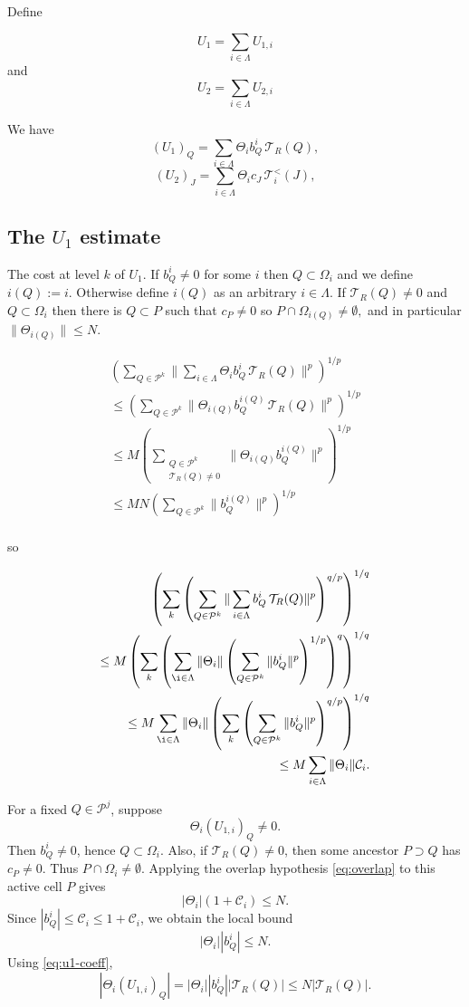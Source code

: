 \documentclass[11pt]{article}
\newcommand{\Pcal}{\mathcal P}
\newcommand{\Ccal}{\mathcal C}
\newcommand{\Tcal}{\mathcal T}
\newcommand{\Om}{\Omega}
\newcommand{\Th}{\Theta}
\newcommand{\1}{\mathbf 1}
\newcommand{\abs}[1]{\left|#1\right|}
\begin{document}
Define 

$$U_1 = \sum_{i\in \Lambda}  U_{1,i}$$
and
$$U_2 = \sum_{i\in \Lambda}  U_{2,i}$$

We have 
 $$(U_{1})_Q
  =
  \sum_{i\in \Lambda}  \Theta_i b^i_Q\,\Tcal_R(Q),$$
$$(U_{2})_J 
  =
  \sum_{i\in \Lambda}   \Theta_i c_J\,\Tcal_i^{<}(J),$$
  
  
\subsection*{The \(U_1\) estimate}

The cost at level $k$ of $U_1$. If $b^i_Q\neq 0$  for some $i$ then  $Q\subset \Omega_i$ and we define $i(Q):=i$. Otherwise define $i(Q)$ as an arbitrary $i\in \Lambda$. If   $\Tcal_R(Q)\neq 0$ and  $Q\subset \Omega_i$ then there is $ Q\subset P$ such that $c_P\neq 0$ so $P\cap \Omega_{i(Q)}\neq \emptyset,$ and in particular $\|\Theta_{i(Q)}\|\leq N$.  

\begin{align} \left(  \sum_{Q\in \mathcal{P}^k} \|\sum_{i\in \Lambda} \Theta_i b^i_Q\,\Tcal_R(Q)\|^p \right)^{1/p} \\
\leq \left(  \sum_{Q\in \mathcal{P}^k} \|\Theta_{i(Q)} b^{i(Q)}_Q\,\Tcal_R(Q)\|^p \right)^{1/p} \\
\leq  M \left(  \sum_{\substack{Q\in \mathcal{P}^k\\ \Tcal_R(Q)\neq 0}}  \|\Theta_{i(Q)} b^{i(Q)}_Q\|^p \right)^{1/p}\\
\leq  M  N \left( \sum_{Q\in \mathcal{P}^k} \|b^{i(Q)}_Q\|^p \right)^{1/p}\\
\end{align} 

so 


\begin{align}\left(  \sum_k \left(  \sum_{Q\in \mathcal{P}^k} \|\sum_{i\in \Lambda}b^i_Q\,\Tcal_R(Q)\|^p \right)^{q/p}\right)^{1/q}  \\
\leq  M \left( \sum_k \left( \sum_{\i\in \Lambda} \|\Theta_i \|  \left(  \sum_{Q\in \mathcal{P}^k} \|b^i_Q\|^p \right)^{1/p} \right)^{q} \right)^{1/q} \\
\leq  M \sum_{\i\in \Lambda}  \|\Theta_i \| \left( \sum_k \left(    \sum_{Q\in \mathcal{P}^k} \|b^i_Q\|^p \right)^{q/p}  \right)^{1/q} \\
\leq M \sum_{i\in \Lambda} \|\Theta_i \| \Ccal_i.
\end{align} 

For a fixed \(Q\in\Pcal^j\), suppose
\[
  \Th_i (U_{1,i})_Q\neq0.
\]
Then \(b^i_Q\neq0\), hence \(Q\subset\Om_i\).  Also, if
\(\Tcal_R(Q)\neq0\), then some ancestor \(P\supset Q\) has \(c_P\neq0\).
Thus \(P\cap\Om_i\neq\emptyset\).  Applying the overlap hypothesis
\eqref{eq:overlap} to this active cell \(P\) gives
\[
  \abs{\Th_i}(1+\Ccal_i)\le N.
\]
Since \(\abs{b^i_Q}\le \Ccal_i\le1+\Ccal_i\), we obtain the local bound
\begin{equation}\label{eq:u1-local}
  \abs{\Th_i}\abs{b^i_Q}
  \le N.
\end{equation}
Using \eqref{eq:u1-coeff},
\[
  \abs{\Th_i(U_{1,i})_Q}
  =
  \abs{\Th_i}\abs{b^i_Q}\abs{\Tcal_R(Q)}
  \le
  N\abs{\Tcal_R(Q)}.
\]
\end{document}

